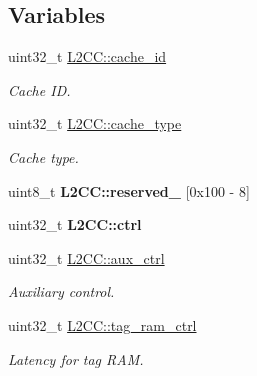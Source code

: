\subsection*{Variables}
\begin{DoxyCompactItemize}
\item 
\mbox{\label{group__L2C-310__cache_ga906c77e66f73058edc5197e7cacf47f2}} 
uint32\+\_\+t \mbox{\hyperlink{group__L2C-310__cache_ga906c77e66f73058edc5197e7cacf47f2}{L2\+C\+C\+::cache\+\_\+id}}
\begin{DoxyCompactList}\small\item\em Cache ID. \end{DoxyCompactList}\item 
\mbox{\label{group__L2C-310__cache_ga0bb676a1f10455046437fced13d2e0c9}} 
uint32\+\_\+t \mbox{\hyperlink{group__L2C-310__cache_ga0bb676a1f10455046437fced13d2e0c9}{L2\+C\+C\+::cache\+\_\+type}}
\begin{DoxyCompactList}\small\item\em Cache type. \end{DoxyCompactList}\item 
\mbox{\label{group__L2C-310__cache_ga04897ae61ea2e8e237a733ca6cff08e4}} 
uint8\+\_\+t {\bfseries L2\+C\+C\+::reserved\+\_} \mbox{[}0x100 -\/ 8\mbox{]}
\item 
\mbox{\label{group__L2C-310__cache_ga05b944448f3793749d3a54548f54dbb6}} 
uint32\+\_\+t {\bfseries L2\+C\+C\+::ctrl}
\item 
\mbox{\label{group__L2C-310__cache_ga163d40ba8e125c80645e9ee4f0675cba}} 
uint32\+\_\+t \mbox{\hyperlink{group__L2C-310__cache_ga163d40ba8e125c80645e9ee4f0675cba}{L2\+C\+C\+::aux\+\_\+ctrl}}
\begin{DoxyCompactList}\small\item\em Auxiliary control. \end{DoxyCompactList}\item 
\mbox{\label{group__L2C-310__cache_gaeeb3f145047de2a8620ab791b25c5314}} 
uint32\+\_\+t \mbox{\hyperlink{group__L2C-310__cache_gaeeb3f145047de2a8620ab791b25c5314}{L2\+C\+C\+::tag\+\_\+ram\+\_\+ctrl}}
\begin{DoxyCompactList}\small\item\em Latency for tag R\+AM. \end{DoxyCompactList}\item 

\end{DoxyCompactItemize}

